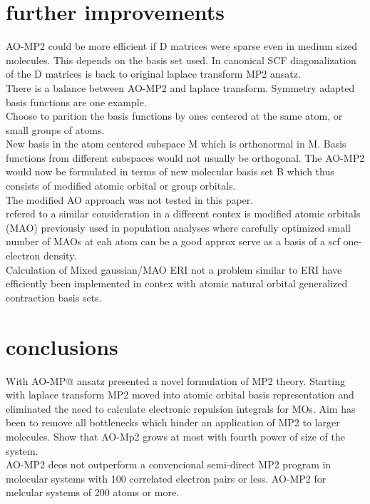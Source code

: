 \documentclass[10pt, draft]{article}
\begin{document}
\section{further improvements }
AO-MP2 could be more efficient if D matrices were sparse even in medium sized molecules.  This depends on the basis set used.  In canonical SCF diagonalization of the D matrices is back to original laplace transform MP2 ansatz.\\
There is a balance between AO-MP2 and laplace transform. Symmetry adapted basis functions are one example.\\
Choose to parition the basis functions by ones centered at the same atom, or small groups of atoms. \\
New basis in the atom centered subspace M which is orthonormal in M.  Basis functions from different subspaces would not usually be orthogonal.  The AO-MP2 would now be formulated in terms of new molecular basis set B which thus consists of modified atomic orbital or group orbitals. \\
The modified AO approach was not tested in this paper.\\
refered to a similar consideration in a different contex is modified atomic orbitals (MAO) previously used in population analyses where carefully optimized small number of MAOs at eah atom can be a good approx serve as a basis of a scf one-electron density.\\
Calculation of Mixed gaussian/MAO ERI not a problem similar to ERI have efficiently been implemented in contex with atomic natural orbital generalized contraction basis sets.

\section{conclusions}
With AO-MP@ ansatz presented a novel formulation of MP2 theory.  Starting with laplace transform MP2 moved into atomic orbital basis representation and eliminated the need to calculate electronic repulsion integrals for MOs.  Aim has been to remove all bottlenecks which hinder an application of MP2 to larger molecules.
Show that AO-Mp2 grows at most with fourth power of size of the system.  \\
AO-MP2 deos not outperform a convencional semi-direct MP2 program in molecular systems with 100 correlated electron pairs or less.  AO-MP2 for melcular systems of 200 atoms or more.  \\
\end{document}
